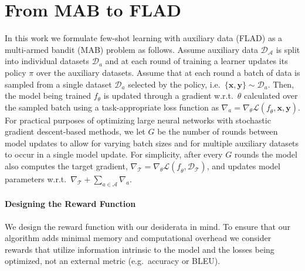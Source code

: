 \section{From MAB to FLAD}
\label{sec:mab_to_flad}

In this work we formulate few-shot learning with auxiliary data (FLAD) as a multi-armed bandit (MAB) problem as follows. Assume auxiliary data $\mathcal{D}_{\mathcal{A}}$ is split into individual datasets $\mathcal{D}_{a}$ and at each round of training a learner updates its policy $\pi$ over the auxiliary datasets. Assume that at each round a batch of data is sampled from a single dataset $\mathcal{D}_{a}$ selected by the policy, i.e.\ $\{\mathbf{x},\mathbf{y}\} \sim \mathcal{D}_{a}$. Then, the model being trained $f_\theta$ is updated through a gradient w.r.t.\ $\theta$ calculated over the sampled batch using a task-appropriate loss function as $\nabla_{a}=\nabla_{\theta}\mathcal{L}(\mathit{f}_{\theta},\mathbf{x},\mathbf{y})$. For practical purposes of optimizing large neural networks with stochastic gradient descent-based methods, we let $G$ be the number of rounds between model updates to allow for varying batch sizes and for multiple auxiliary datasets to occur in a single model update. For simplicity, after every $G$ rounds the model also computes the target gradient, $\nabla_{\mathcal{T}}=\nabla_{\theta}\mathcal{L}(\mathit{f}_{\theta},\mathcal{D}_{\mathcal{T}})$, and updates model parameters w.r.t.\ $\nabla_{\mathcal{T}}+\sum_{a\in\mathcal{A}}\nabla_{a}$.

\paragraph{Designing the Reward Function}
We design the reward function with our desiderata in mind. To ensure that our algorithm adds minimal memory and computational overhead we consider rewards that utilize information intrinsic to the model and the losses being optimized, not an external metric (e.g.\ accuracy or BLEU).

